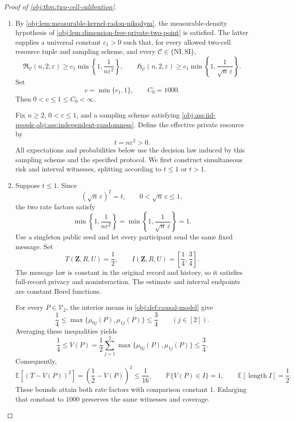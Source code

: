 \documentclass[11pt]{article}
\begin{document}
\begin{proof}[Proof of \cref{obj:thm:two-cell-calibration}]
\begin{enumerate}
\item
By \cref{obj:lem:measurable-kernel-radon-nikodym}, the measurable-density hypothesis of \cref{obj:lem:dimension-free-private-two-point} is satisfied. The latter supplies a universal constant \(c_1>0\) such that, for every allowed two-cell resource tuple and sampling scheme, and every \(\mathcal C\in\{\mathrm{NI},\mathrm{SI}\}\),
\[
\mathfrak R_{\mathcal C}(n,2,\varepsilon)
\ge c_1\min\left\{1,\frac1{n\varepsilon^2}\right\},
\qquad
\mathfrak H_{\mathcal C}(n,2,\varepsilon)
\ge c_1\min\left\{1,\frac1{\sqrt n\,\varepsilon}\right\}.
\]
Set
\[
c=\min\{c_1,1\},
\qquad C_0=1000.
\]
Then \(0<c\le1\le C_0<\infty\).

Fix \(n\ge2\), \(0<\varepsilon\le1\), and a sampling scheme satisfying
\cref{obj:ass:iid-people,obj:ass:independent-randomness}. Define the effective private resource by
\[
t=n\varepsilon^2>0.
\]
All expectations and probabilities below use the decision law induced by this sampling scheme and the specified protocol. We first construct simultaneous risk and interval witnesses, splitting according to \(t\le1\) or \(t>1\).

\item
Suppose \(t\le1\). Since
\[
(\sqrt n\,\varepsilon)^2=t,
\qquad 0<\sqrt n\,\varepsilon\le1,
\]
the two rate factors satisfy
\[
\min\left\{1,\frac1{n\varepsilon^2}\right\}
=
\min\left\{1,\frac1{\sqrt n\,\varepsilon}\right\}
=1.
\]
Use a singleton public seed and let every participant send the same fixed message. Set
\[
T(\mathbf Z,R,U)=\frac12,
\qquad
I(\mathbf Z,R,U)=\left[\frac14,\frac34\right].
\]
The message law is constant in the original record and history, so it satisfies full-record privacy and noninteraction. The estimate and interval endpoints are constant Borel functions.

For every \(P\in\mathcal V_2\), the interior means in
\cref{obj:def:causal-model} give
\[
\frac14\le
\max\{\mu_{0j}(P),\mu_{1j}(P)\}
\le\frac34
\qquad(j\in[2]).
\]
Averaging these inequalities yields
\[
\frac14\le
V(P)=\frac12\sum_{j=1}^{2}
\max\{\mu_{0j}(P),\mu_{1j}(P)\}
\le\frac34.
\]
Consequently,
\[
\mathbb E[(T-V(P))^2]
=\left(\frac12-V(P)\right)^2
\le\frac1{16},
\qquad
\mathbb P\{V(P)\in I\}=1,
\qquad
\mathbb E[\operatorname{length}I]=\frac12.
\]
These bounds attain both rate factors with comparison constant \(1\). Enlarging that constant to \(1000\) preserves the same witnesses and coverage.


\end{enumerate}
\end{proof}
\end{document}
